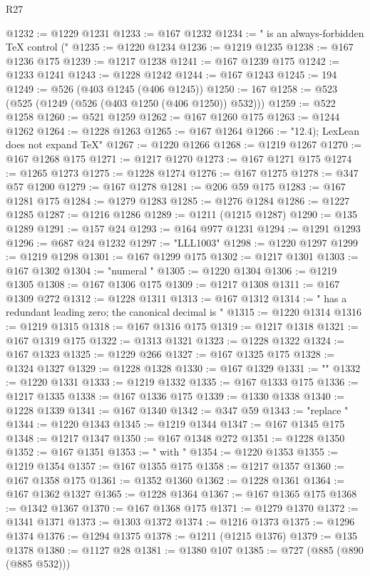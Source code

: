 \begin{lexlean}{R27}
\begin{coremodule}
@1232 := @1229 @1231
@1233 := @167 @1232
@1234 := " is an always-forbidden TeX control ("
@1235 := @1220 @1234
@1236 := @1219 @1235
@1238 := @167 @1236 @175
@1239 := @1217 @1238
@1241 := @167 @1239 @175
@1242 := @1233 @1241
@1243 := @1228 @1242
@1244 := @167 @1243
@1245 := 194
@1249 := @526 (@403 @1245 (@406 @1245))
@1250 := 167
@1258 := @523 (@525 (@1249 (@526 (@403 @1250 (@406 @1250)) @532)))
@1259 := @522 @1258
@1260 := @521 @1259
@1262 := @167 @1260 @175
@1263 := @1244 @1262
@1264 := @1228 @1263
@1265 := @167 @1264
@1266 := "12.4); LexLean does not expand TeX"
@1267 := @1220 @1266
@1268 := @1219 @1267
@1270 := @167 @1268 @175
@1271 := @1217 @1270
@1273 := @167 @1271 @175
@1274 := @1265 @1273
@1275 := @1228 @1274
@1276 := @167 @1275
@1278 := @347 @57 @1200
@1279 := @167 @1278
@1281 := @206 @59 @175
@1283 := @167 @1281 @175
@1284 := @1279 @1283
@1285 := @1276 @1284
@1286 := @1227 @1285
@1287 := @1216 @1286
@1289 := @1211 (@1215 @1287)
@1290 := @135 @1289
@1291 := @157 @24
@1293 := @164 @977 @1231
@1294 := @1291 @1293
@1296 := @687 @24 @1232
@1297 := "LLL1003"
@1298 := @1220 @1297
@1299 := @1219 @1298
@1301 := @167 @1299 @175
@1302 := @1217 @1301
@1303 := @167 @1302
@1304 := "numeral "
@1305 := @1220 @1304
@1306 := @1219 @1305
@1308 := @167 @1306 @175
@1309 := @1217 @1308
@1311 := @167 @1309 @272
@1312 := @1228 @1311
@1313 := @167 @1312
@1314 := " has a redundant leading zero; the canonical decimal is "
@1315 := @1220 @1314
@1316 := @1219 @1315
@1318 := @167 @1316 @175
@1319 := @1217 @1318
@1321 := @167 @1319 @175
@1322 := @1313 @1321
@1323 := @1228 @1322
@1324 := @167 @1323
@1325 := @1229 @266
@1327 := @167 @1325 @175
@1328 := @1324 @1327
@1329 := @1228 @1328
@1330 := @167 @1329
@1331 := ""
@1332 := @1220 @1331
@1333 := @1219 @1332
@1335 := @167 @1333 @175
@1336 := @1217 @1335
@1338 := @167 @1336 @175
@1339 := @1330 @1338
@1340 := @1228 @1339
@1341 := @167 @1340
@1342 := @347 @59
@1343 := "replace "
@1344 := @1220 @1343
@1345 := @1219 @1344
@1347 := @167 @1345 @175
@1348 := @1217 @1347
@1350 := @167 @1348 @272
@1351 := @1228 @1350
@1352 := @167 @1351
@1353 := " with "
@1354 := @1220 @1353
@1355 := @1219 @1354
@1357 := @167 @1355 @175
@1358 := @1217 @1357
@1360 := @167 @1358 @175
@1361 := @1352 @1360
@1362 := @1228 @1361
@1364 := @167 @1362 @1327
@1365 := @1228 @1364
@1367 := @167 @1365 @175
@1368 := @1342 @1367
@1370 := @167 @1368 @175
@1371 := @1279 @1370
@1372 := @1341 @1371
@1373 := @1303 @1372
@1374 := @1216 @1373
@1375 := @1296 @1374
@1376 := @1294 @1375
@1378 := @1211 (@1215 @1376)
@1379 := @135 @1378
@1380 := @1127 @28
@1381 := @1380 @107
@1385 := @727 (@885 (@890 (@885 @532)))

\end{coremodule}
\end{lexlean}
